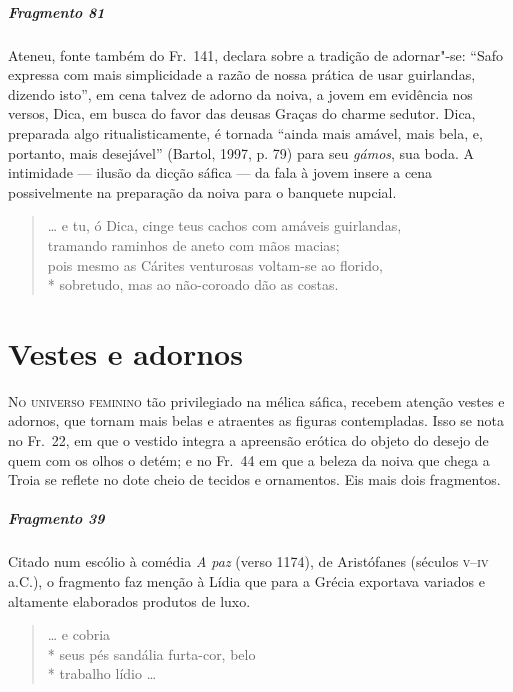 {\paragraph{Fragmento 81}

{\small Ateneu, fonte também do Fr.~141, declara sobre a tradição de adornar"-se:
``Safo expressa com mais simplicidade a razão de nossa prática
de usar guirlandas, dizendo isto”, em cena talvez de adorno da noiva, a jovem em evidência nos versos, Dica, em busca do favor das deusas Graças do charme sedutor.
Dica, preparada algo ritualisticamente, é tornada “ainda mais amável, mais bela, e, portanto, mais desejável” (Bartol, 1997, p. 79) para seu \textit{gámos}, sua boda. A intimidade --- ilusão da dicção sáfica --- da fala à jovem insere a cena possivelmente na preparação da noiva para o banquete nupcial.}

\begin{verse}
\ldots{} e tu, ó Dica, cinge teus cachos com amáveis \qb{}guirlandas,\\
tramando raminhos de aneto com mãos macias;\\
pois mesmo as Cárites venturosas voltam-se ao \qb{}florido,\\*
sobretudo, mas ao não-coroado dão as costas.
\end{verse}

\chapter{Vestes e adornos}

\textsc{No universo feminino} tão privilegiado na mélica sáfica, recebem atenção vestes e
adornos, que tornam mais belas e atraentes as figuras contempladas. Isso se
nota no Fr.~22, em que o vestido integra a apreensão erótica do objeto do
desejo de quem com os olhos o detém; e no Fr.~44 em que a beleza da noiva que chega a
Troia se reflete no dote cheio de tecidos e ornamentos. Eis mais dois fragmentos.


\paragraph{Fragmento 39}

{\small Citado num escólio à comédia \textit{A paz} (verso 1174), de Aristófanes (séculos \textsc{v}--\textsc{iv} a.C.),
o fragmento faz menção à Lídia que para a Grécia exportava variados e altamente
elaborados produtos de luxo.}

\begin{verse}
\ldots{} e cobria\\*
seus pés sandália furta-cor, belo\\*
trabalho lídio \ldots{}
\end{verse}

}
